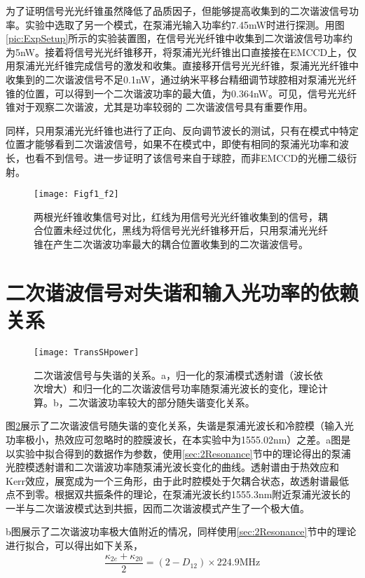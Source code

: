 为了证明信号光光纤锥虽然降低了品质因子，但能够提高收集到的二次谐波信号功率。实验中选取了另一个模式，在泵浦光输入功率约7.45mW时进行探测。用图\ref{pic:ExpSetup}所示的实验装置图，在信号光光纤锥中收集到二次谐波信号功率约为5nW。接着将信号光光纤锥移开，将泵浦光光纤锥出口直接接在EMCCD上，仅用泵浦光光纤锥完成信号的激发和收集。直接移开信号光光纤锥，泵浦光光纤锥中收集到的二次谐波信号不足0.1nW，通过纳米平移台精细调节球腔相对泵浦光光纤锥的位置，可以得到一个二次谐波功率的最大值，为0.364nW。可见，信号光光纤锥对于观察二次谐波，尤其是功率较弱的 二次谐波信号具有重要作用。

同样，只用泵浦光光纤锥也进行了正向、反向调节波长的测试，只有在模式中特定位置才能够看到二次谐波信号，如果不在模式中，即使有相同的泵浦光功率和波长，也看不到信号。进一步证明了该信号来自于球腔，而非EMCCD的光栅二级衍射。

\begin{figure}
\centering
\texttt{[image: Figf1\_f2]}
\caption{两根光纤锥收集信号对比，红线为用信号光光纤锥收集到的信号，耦合位置未经过优化，黑线为将信号光光纤锥移开后，只用泵浦光光纤锥在产生二次谐波功率最大的耦合位置收集到的二次谐波信号。}
\label{pic:Figf1_f2}
\end{figure}

\section{二次谐波信号对失谐和输入光功率的依赖关系}


\begin{figure}
\centering
\texttt{[image: TransSHpower]}
\caption{二次谐波信号与失谐的关系。a，归一化的泵浦模式透射谱（波长依次增大）和归一化的二次谐波信号功率随泵浦光波长的变化，理论计算。b，二次谐波功率较大的部分随失谐变化关系。}
\label{pic:TransSHpower}
\end{figure}

图\ref{pic:TransSHpower}展示了二次谐波信号随失谐的变化关系，失谐是泵浦光波长和冷腔模（输入光功率极小，热效应可忽略时的腔膜波长，在本实验中为1555.02nm）之差。a图是以实验中拟合得到的数据作为参数，使用\ref{sec:2Resonance}节中的理论得出的泵浦光腔模透射谱和二次谐波功率随泵浦光波长变化的曲线。透射谱由于热效应和Kerr效应，展宽成为一个三角形\cite{carmon2004dynamical}，由于此时腔模处于欠耦合状态，故透射谱最低点不到零。根据双共振条件的理论，在泵浦光波长约1555.3nm附近泵浦光波长的一半与二次谐波模式达到共振，因而二次谐波模式产生了一个极大值。

b图展示了二次谐波功率极大值附近的情况，同样使用\ref{sec:2Resonance}节中的理论进行拟合，可以得出如下关系，
\begin{equation}
\frac{\kappa_{2e}+\kappa_{20}}{2} = (2-D_{12})\times 224.9\mathrm{ MHz}
\end{equation}

